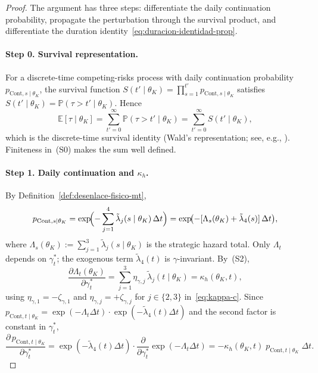 \documentclass[ecta,nameyear,final,supplement]{econsocart}
\numberwithin{equation}{section}
\numberwithin{table}{section}
\theoremstyle{definition}
\newcommand{\Prob}{\mathbb{P}}
\begin{document}
\begin{proof}
The argument has three steps: differentiate the daily continuation probability,
propagate the perturbation through the survival product, and differentiate the
duration identity~\eqref{eq:duracion-identidad-prop}.

\paragraph{Step 0. Survival representation.}
For a discrete-time competing-risks process with daily continuation probability
$p_{\mathrm{Cont},s\mid\theta_K}$, the survival function
$S(t'\mid\theta_K)=\prod_{s=1}^{t'}p_{\mathrm{Cont},s\mid\theta_K}$ satisfies
$S(t'\mid\theta_K)=\Prob(\tau>t'\mid\theta_K)$. Hence
\[
\mathbb{E}[\tau\mid\theta_K]
=\sum_{t'=0}^{\infty}\Prob(\tau>t'\mid\theta_K)
=\sum_{t'=0}^{\infty}S(t'\mid\theta_K),
\]
which is the discrete-time survival identity (Wald's representation; see, e.g.,
\citet{KalbfleischPrentice2002}). Finiteness in~\textup{(S0)} makes the sum
well defined.

\paragraph{Step 1. Daily continuation and $\kappa_h$.}
By Definition~\ref{def:desenlace-fisico-mt},
\[
p_{\mathrm{Cont},s\mid\theta_K}
=\exp\!\Bigl(-\sum_{j=1}^{4}\tilde\lambda_j(s\mid\theta_K)\,\Delta t\Bigr)
=\exp\!\bigl(-[\Lambda_s(\theta_K)+\tilde\lambda_4(s)]\,\Delta t\bigr),
\]
where $\Lambda_s(\theta_K):=\sum_{j=1}^{3}\tilde\lambda_j(s\mid\theta_K)$ is the
strategic hazard total. Only $\Lambda_t$ depends on $\gamma_t^\ast$; the
exogenous term $\tilde\lambda_4(t)$ is $\gamma$-invariant. By~\textup{(S2)},
\[
\frac{\partial\Lambda_t(\theta_K)}{\partial\gamma_t^\ast}
=\sum_{j=1}^{3}\eta_{\gamma,j}\,\tilde\lambda_j(t\mid\theta_K)
=\kappa_h(\theta_K,t),
\]
using $\eta_{\gamma,1}=-\zeta_{\gamma,1}$ and $\eta_{\gamma,j}=+\zeta_{\gamma,j}$
for $j\in\{2,3\}$ in~\eqref{eq:kappa-c}. Since
$p_{\mathrm{Cont},t\mid\theta_K}=\exp(-\Lambda_t\Delta t)\cdot
\exp(-\tilde\lambda_4(t)\Delta t)$ and the second factor is constant in
$\gamma_t^\ast$,
\begin{equation}
\label{eq:dpCont-dgamma}
\frac{\partial\,p_{\mathrm{Cont},t\mid\theta_K}}{\partial\gamma_t^\ast}
=\exp(-\tilde\lambda_4(t)\Delta t)\cdot
\frac{\partial}{\partial\gamma_t^\ast}\exp(-\Lambda_t\Delta t)
=-\kappa_h(\theta_K,t)\;p_{\mathrm{Cont},t\mid\theta_K}\;\Delta t.
\end{equation}


\end{proof}
\end{document}
